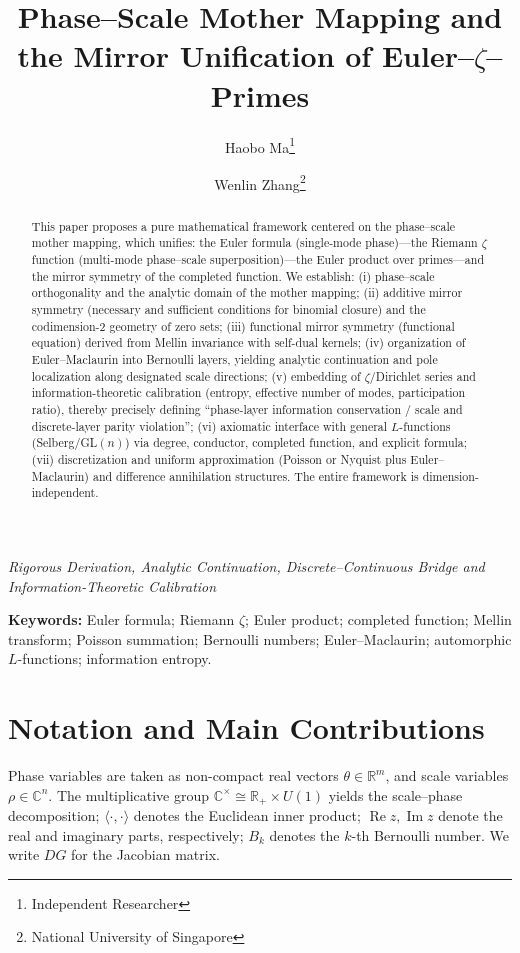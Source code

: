 \documentclass[11pt,a4paper]{article}
\title{Phase--Scale Mother Mapping and the Mirror Unification of Euler--$\zeta$--Primes}
\author{Haobo Ma\thanks{Independent Researcher} \and Wenlin Zhang\thanks{National University of Singapore}}
\date{}
\theoremstyle{remark}
\DeclareMathOperator{\Re}{Re}
\DeclareMathOperator{\Im}{Im}
\begin{document}
\maketitle

\begin{center}
\textit{Rigorous Derivation, Analytic Continuation, Discrete--Continuous Bridge and Information-Theoretic Calibration}
\end{center}

\begin{abstract}
This paper proposes a pure mathematical framework centered on the phase--scale mother mapping, which unifies: the Euler formula (single-mode phase)---the Riemann $\zeta$ function (multi-mode phase--scale superposition)---the Euler product over primes---and the mirror symmetry of the completed function. We establish: (i) phase--scale orthogonality and the analytic domain of the mother mapping; (ii) additive mirror symmetry (necessary and sufficient conditions for binomial closure) and the codimension-2 geometry of zero sets; (iii) functional mirror symmetry (functional equation) derived from Mellin invariance with self-dual kernels; (iv) organization of Euler--Maclaurin into Bernoulli layers, yielding analytic continuation and pole localization along designated scale directions; (v) embedding of $\zeta$/Dirichlet series and information-theoretic calibration (entropy, effective number of modes, participation ratio), thereby precisely defining ``phase-layer information conservation / scale and discrete-layer parity violation''; (vi) axiomatic interface with general $L$-functions (Selberg/GL$(n)$) via degree, conductor, completed function, and explicit formula; (vii) discretization and uniform approximation (Poisson or Nyquist plus Euler--Maclaurin) and difference annihilation structures. The entire framework is dimension-independent.
\end{abstract}

\noindent\textbf{Keywords:} Euler formula; Riemann $\zeta$; Euler product; completed function; Mellin transform; Poisson summation; Bernoulli numbers; Euler--Maclaurin; automorphic $L$-functions; information entropy.

\section{Notation and Main Contributions}

Phase variables are taken as non-compact real vectors $\theta\in\mathbb{R}^m$, and scale variables $\rho\in\mathbb{C}^n$. The multiplicative group $\mathbb{C}^\times\cong\mathbb{R}_+\times U(1)$ yields the scale--phase decomposition; $\langle\cdot,\cdot\rangle$ denotes the Euclidean inner product; $\Re z,\Im z$ denote the real and imaginary parts, respectively; $B_{k}$ denotes the $k$-th Bernoulli number. We write $DG$ for the Jacobian matrix.
\end{document}
